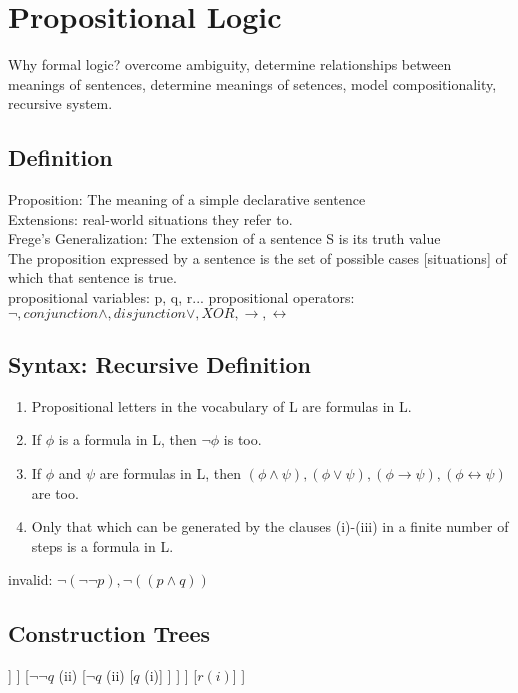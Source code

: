 \section{Propositional Logic}
Why formal logic? overcome ambiguity, determine relationships between meanings of sentences, determine meanings of setences, model compositionality, recursive system.

\subsection*{Definition}
Proposition: The meaning of a simple declarative sentence \\
Extensions: real-world situations they refer to. \\
Frege’s Generalization: The extension of a sentence S is its truth value \\
The proposition expressed by a sentence is the set of possible cases [situations] of which that sentence is true. \\
propositional variables: p, q, r...
propositional operators: $\neg, conjunction \land, disjunction \lor, XOR, \to, \leftrightarrow$

\subsection*{Syntax: Recursive Definition}
\begin{enumerate}
\item Propositional letters in the vocabulary of L are formulas in L.
\item If $\phi$ is a formula in L, then $\neg \phi$ is too.
\item If $\phi$ and $\psi$ are formulas in L, then $(\phi \land \psi), (\phi \lor \psi), (\phi \to \psi), (\phi \leftrightarrow \psi)$ are too.
\item Only that which can be generated by the clauses (i)-(iii) in a finite
number of steps is a formula in L.
\end{enumerate}
invalid: $\neg (\neg \neg p), \neg ((p \land q))$ \\

\subsection*{Construction Trees}
\begin{forest}
[$(\neg (p \lor q) \to \neg \neg q) \leftrightarrow r$ $(iii. \leftrightarrow)$
	[$(\neg (p \lor q) \to \neg \neg q)$ $(iii. \to)$
		[$\neg (p \lor q)$ $(ii)$
			[$p \lor q$ $(iii. \lor)$
				[$p$ (i)]
				[$q$ (i)]
			]			
		]
		[$\neg \neg q$ (ii)
			[$\neg q$ (ii)
				[$q$ (i)]
			]
		]
	]
	[$r(i)$]
]
\end{forest}
